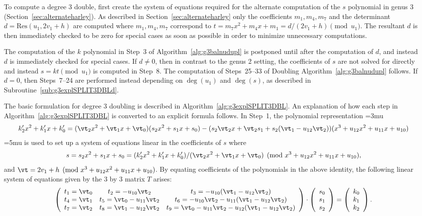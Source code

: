 To compute a degree 3 double, first create the system of equations required for the
alternate computation of the $s$ polynomial in genus 3
(Section~\ref{sec:alternateharley}). As described in
Section~\ref{sec:alternateharley} only the coefficients $m_1,m_4,m_7$ and the
determinant $d = \mathrm{Res}(u_1,2v_1+h)$ are computed where $m_1,m_4,m_7$
correspond to $t = m_7x^2 + m_4x + m_1 = d/(2v_1 + h) \pmod{u_1}$. The resultant
$d$ is then immediately checked to be zero for special cases as soon as possible
in order to minimize unnecessary computations.


The computation of the $k$ polynomial in Step~3 of
Algorithm~\ref{alg:g3balnudupl} is postponed until after the computation of $d$,
and instead $d$ is immediately checked for special cases. If $d \neq 0$, then in
contrast to the genus 2 setting, the coefficients of $s$ are not solved for
directly and instead $s = kt \pmod{u_1}$ is computed in Step~8. The computation
of Steps~25--33 of Doubling Algorithm~\ref{alg:g3balnudupl} follows. If $d = 0$,
then Steps~7--24 are performed instead depending on $\deg(u_1)$ and $\deg(s)$, as
described in Subroutine~\ref{sub:g3explSPLIT3DBLd}. 

The basic formulation for degree 3 doubling is described in
Algorithm~\ref{alg:g3explSPLIT3DBL}. An explanation of how each step in
Algorithm~\ref{alg:g3explSPLIT3DBL} is converted to an explicit formula follows.
In Step~1, the polynomial representation \thickmuskip=3mu $$k'_2x^2 + k'_1x + k'_0 = (\vt_2x^2 +
\vt_1x + \vt_0)(s_2x^2 + s_1x + s_0) - (s_2\vt_2x + \vt_2s_1 + s_2(\vt_1 -
u_{12}\vt_2))(x^3 + u_{12}x^2 + u_{11}x + u_{10})$$ \thickmuskip=5mu is used to set up a system
of equations linear in the coefficients of $s$ where
$$s = s_2x^2 + s_1x + s_0 = (k'_2x^2 + k'_1x + k'_0)/(\vt_2x^2 + \vt_1x + \vt_0)
\pmod{x^3 + u_{12}x^2 + u_{11}x + u_{10}},$$ and $\vt = 2v_1 + h \pmod{x^3 +
u_{12}x^2 + u_{11}x + u_{10}}$. By equating coefficients of the polynomials in
the above identity, the following linear system of equations given by the 3 by 3
matrix $T$ arises: $$ \left(
\begin{array}{ccc} 
 t_1 = \vt_0 & t_2 = -u_{10}\vt_2        & t_3 = -u_{10}(\vt_1 - u_{12}\vt_2)  \\
 t_4 = \vt_1 & t_5 = \vt_0 - u_{11}\vt_2 & t_6 = -u_{10}\vt_2 - u_{11}(\vt_1 - u_{12}\vt_2)  \\
 t_7 = \vt_2 & t_8 = \vt_1 - u_{12}\vt_2 & t_9 = \vt_0 - u_{11}\vt_2 - u_{12}(\vt_1 - u_{12}\vt_2)  
\end{array} \right) \cdot 
\left( \begin{array}{c}
s_0  \\
s_1   \\
s_2   \end{array} \right) = 
\left( \begin{array}{c}
k_0  \\
k_1   \\
k_2   \end{array} \right).$$ 

